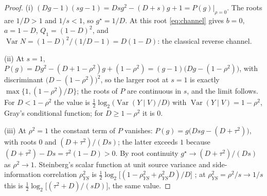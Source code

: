 ﻿\documentclass[11pt,onecolumn]{IEEEtran}
\begin{document}
\begin{proof}
(i) $(Dg-1)(sg-1)=Dsg^2-(D+s)g+1=P(g)\big|_{\rho=0}$. The roots are
$1/D>1$ and $1/s<1$, so $g^\star=1/D$. At this root \eqref{eq:channel}
gives $b=0$, $a=1-D$, $Q_1=(1-D)^2$, and
$\operatorname{Var}N=(1-D)^2/(1/D-1)=D(1-D)$: the classical reverse
channel.

(ii) At $s=1$,
$P(g)=Dg^2-(D+1-\rho^2)g+(1-\rho^2)=(g-1)\bigl(Dg-(1-\rho^2)\bigr)$,
with discriminant $\bigl(D-(1-\rho^2)\bigr)^2$, so the larger root at
$s=1$ is exactly $\max\{1,(1-\rho^2)/D\}$; the roots of $P$ are
continuous in $s$, and the limit follows. For $D<1-\rho^2$ the value
is $\tfrac12\log_2\bigl(\operatorname{Var}(Y\mid V)/D\bigr)$ with
$\operatorname{Var}(Y\mid V)=1-\rho^2$, Gray's conditional function;
for $D\ge1-\rho^2$ it is $0$.

(iii) At $\rho^2=1$ the constant term of $P$ vanishes:
$P(g)=g\bigl(Dsg-(D+\tau^2)\bigr)$, with roots $0$ and
$(D+\tau^2)/(Ds)$; the latter exceeds $1$ because
$(D+\tau^2)-Ds=\tau^2(1-D)>0$. By root continuity
$g^\star\to(D+\tau^2)/(Ds)$ as $\rho^2\to1$. Steinberg's scalar
function at unit source variance and side-information correlation
$\rho_{YS}^2$ is
$\tfrac12\log_2\bigl[(1-\rho_{YS}^2+\rho_{YS}^2D)/D\bigr]$
\cite{steinberg2009}; at $\rho_{YS}^2=\rho^2/s\to1/s$
this is $\tfrac12\log_2\bigl[(\tau^2+D)/(sD)\bigr]$, the same value.
\end{proof}
\end{document}
